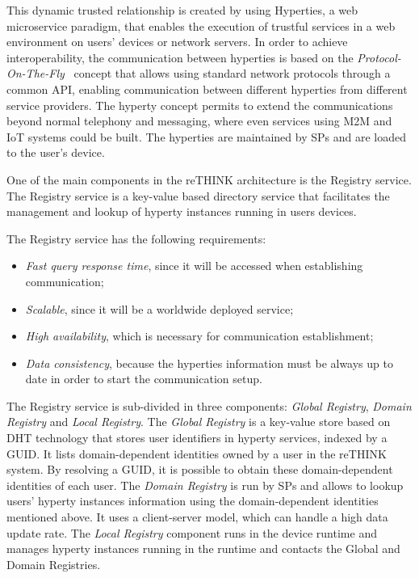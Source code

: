 This dynamic trusted relationship is created by using \ac{Hyperties}, a web microservice paradigm, that enables the execution of trustful services in a web environment on users' devices or network servers.
In order to achieve interoperability, the communication between hyperties is based on the \textit{Protocol-On-The-Fly}~\cite{protofly} concept that allows using standard network protocols through a common API, enabling communication between different hyperties from different service providers.
The hyperty concept permits to extend the communications beyond normal telephony and messaging, where even services using \ac{M2M} and \ac{IoT} systems could be built.
The hyperties are maintained by \acp{SP} and are loaded to the user's device.

One of the main components in the reTHINK architecture is the Registry service.
The Registry service is a key-value based directory service that facilitates the management and lookup of hyperty instances running in users devices.

The Registry service has the following requirements:
\begin{itemize}
  \item \textit{Fast query response time}, since it will be accessed when establishing communication;
	\item \textit{Scalable}, since it will be a worldwide deployed service;
  \item \textit{High availability}, which is necessary for communication establishment;
  \item \textit{Data consistency}, because the hyperties information must be always up to date in order to start the communication setup.
\end{itemize}

The Registry service is sub-divided in three components: \textit{Global Registry}, \textit{Domain Registry} and \textit{Local Registry}.
The \textit{Global Registry} is a key-value store based on \ac{DHT} technology that stores user identifiers in hyperty services, indexed by a \ac{GUID}.
It lists domain-dependent identities owned by a user in the reTHINK system.
By resolving a \ac{GUID}, it is possible to obtain these domain-dependent identities of each user.
The \textit{Domain Registry} is run by \acp{SP} and allows to lookup users' hyperty instances information using the domain-dependent identities mentioned above.
It uses a client-server model, which can handle a high data update rate.
The \textit{Local Registry} component runs in the device runtime and manages hyperty instances running in the runtime and contacts the Global and Domain Registries.

